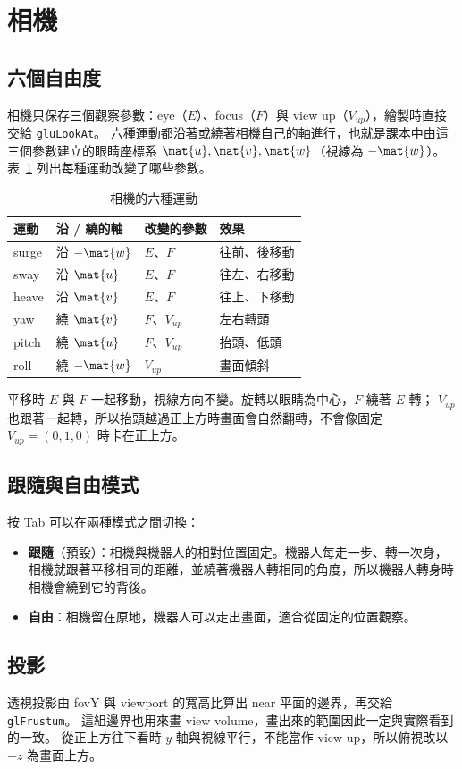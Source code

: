 \section{相機}
\label{sec:camera}

\subsection{六個自由度}

相機只保存三個觀察參數：eye（$E$）、focus（$F$）與 view up（$V_{up}$），繪製時直接交給 \lstinline|gluLookAt|。
六種運動都沿著或繞著相機自己的軸進行，也就是課本中由這三個參數建立的眼睛座標系 $\mat{u}, \mat{v}, \mat{w}$（視線為 $-\mat{w}$）。
表~\ref{tab:camera-motions} 列出每種運動改變了哪些參數。

\begin{table}[htbp]
    \centering
    \caption{相機的六種運動}
    \label{tab:camera-motions}
    \small
    \begin{tabular}{llll}
        \toprule
        運動    & 沿 / 繞的軸      & 改變的參數        & 效果     \\
        \midrule
        surge & 沿 $-\mat{w}$ & $E$、$F$      & 往前、後移動 \\
        sway  & 沿 $\mat{u}$  & $E$、$F$      & 往左、右移動 \\
        heave & 沿 $\mat{v}$  & $E$、$F$      & 往上、下移動 \\
        yaw   & 繞 $\mat{v}$  & $F$、$V_{up}$ & 左右轉頭   \\
        pitch & 繞 $\mat{u}$  & $F$、$V_{up}$ & 抬頭、低頭  \\
        roll  & 繞 $-\mat{w}$ & $V_{up}$     & 畫面傾斜   \\
        \bottomrule
    \end{tabular}
\end{table}

平移時 $E$ 與 $F$ 一起移動，視線方向不變。旋轉以眼睛為中心，$F$ 繞著 $E$ 轉；
$V_{up}$ 也跟著一起轉，所以抬頭越過正上方時畫面會自然翻轉，不會像固定 $V_{up} = (0, 1, 0)$ 時卡在正上方。

\subsection{跟隨與自由模式}

按 Tab 可以在兩種模式之間切換：

\begin{itemize}
    \item \textbf{跟隨}（預設）：相機與機器人的相對位置固定。機器人每走一步、轉一次身，
          相機就跟著平移相同的距離，並繞著機器人轉相同的角度，所以機器人轉身時相機會繞到它的背後。
    \item \textbf{自由}：相機留在原地，機器人可以走出畫面，適合從固定的位置觀察。
\end{itemize}

\subsection{投影}

透視投影由 fovY 與 viewport 的寬高比算出 near 平面的邊界，再交給 \lstinline|glFrustum|。
這組邊界也用來畫 view volume，畫出來的範圍因此一定與實際看到的一致。
從正上方往下看時 $y$ 軸與視線平行，不能當作 view up，所以俯視改以 $-z$ 為畫面上方。
